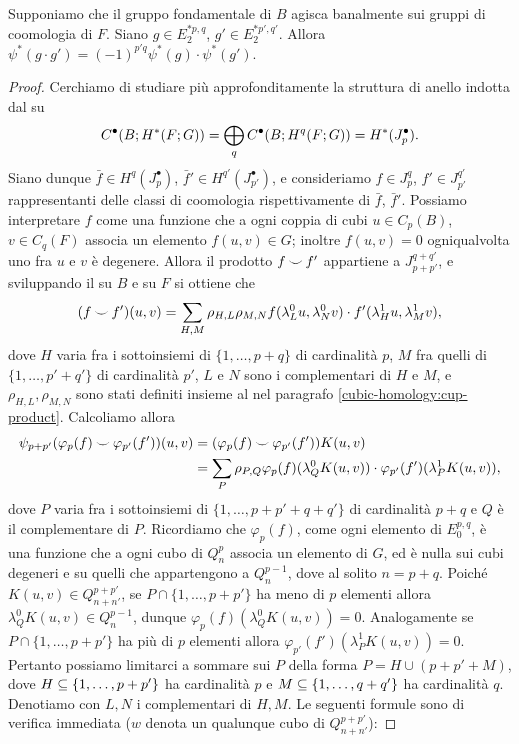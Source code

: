 \begin{proposition}
Supponiamo che il gruppo fondamentale di \(B\) agisca banalmente sui gruppi di coomologia di \(F\). Siano \(g\in E^{\ast p,q}_2\), \(g'\in E^{\ast p',q'}_2\). Allora \(\psi^*(g\cdot g')=(-1)^{p'q}\psi^*(g)\cdot\psi^*(g')\).
\end{proposition}
\begin{proof}
Cerchiamo di studiare più approfonditamente la struttura di anello indotta dal \cupproduct{} su 
\[
C^\bullet(B;H^*(F;G))=\bigoplus_qC^\bullet(B;H^q(F;G))=H^*(J^\bullet_p).
\]
Siano dunque \(\bar{f}\in H^q(J^\bullet_p)\), \(\bar{f}'\in H^{q'}(J^\bullet_{p'})\), e consideriamo \(f\in J^q_p\), \(f'\in J^{q'}_{p'}\) rappresentanti delle classi di coomologia rispettivamente di \(\bar{f}\), \(\bar{f}'\). Possiamo interpretare \(f\) come una funzione che a ogni coppia di cubi \(u\in C_p(B)\), \(v\in C_q(F)\) associa un elemento \(f(u,v)\in G\); inoltre \(f(u,v)=0\) ogniqualvolta uno fra \(u\) e \(v\) è degenere. Allora il prodotto \(f\mathbin{\smile} f'\) appartiene a \(J^{q+q'}_{p+p'}\), e sviluppando il \cupproduct{} su \(B\) e su \(F\) si ottiene che
\[
(f\mathbin{\smile} f')(u,v)=\sum_{H,M}\rho_{H,L}\rho_{M,N}f(\lambda^0_Lu,\lambda^0_Nv)\cdot f'(\lambda^1_Hu,\lambda^1_Mv),
\]
dove \(H\) varia fra i sottoinsiemi di \(\{1,\ldots,p+q\}\) di cardinalità \(p\), \(M\) fra quelli di \(\{1,\ldots,p'+q'\}\) di cardinalità \(p'\), \(L\) e \(N\) sono i complementari di \(H\) e \(M\), e \(\rho_{H,L},\rho_{M,N}\) sono stati definiti insieme al \cupproduct{} nel paragrafo \ref{cubic-homology:cup-product}. Calcoliamo allora
\begin{align*}
\psi_{p+p'}(\varphi_p(f)\mathbin{\smile}\varphi_{p'}(f'))(u,v)&=(\varphi_p(f)\mathbin{\smile}\varphi_{p'}(f'))K(u,v)\\
&=\sum_P\rho_{P,Q}\varphi_p(f)(\lambda^0_QK(u,v))\cdot\varphi_{p'}(f')(\lambda^1_PK(u,v)),
\end{align*}
dove \(P\) varia fra i sottoinsiemi di \(\{1,\ldots,p+p'+q+q'\}\) di cardinalità \(p+q\) e \(Q\) è il complementare di \(P\). Ricordiamo che \(\varphi_p(f)\), come ogni elemento di \(E^{p,q}_0\), è una funzione che a ogni cubo di \(Q^p_n\) associa un elemento di \(G\), ed è nulla sui cubi degeneri e su quelli che appartengono a \(Q^{p-1}_n\), dove al solito \(n=p+q\). Poiché \(K(u,v)\in Q^{p+p'}_{n+n'}\), se \(P\cap\{1,\ldots,p+p'\}\) ha meno di \(p\) elementi allora \(\lambda^0_QK(u,v)\in Q^{p-1}_{n}\), dunque \(\varphi_{p}(f)(\lambda^0_QK(u,v))=0\). Analogamente se \(P\cap\{1,\ldots,p+p'\}\) ha più di \(p\) elementi allora \(\varphi_{p'}(f')(\lambda^1_PK(u,v))=0\). Pertanto possiamo limitarci a sommare sui \(P\) della forma \(P=H\cup(p+p'+M)\), dove \(H\subseteq\{1,\ldots,p+p'\}\) ha cardinalità \(p\) e \(M\subseteq\{1,\ldots,q+q'\}\) ha cardinalità \(q\). Denotiamo con \(L,N\) i complementari di \(H,M\). Le seguenti formule sono di verifica immediata (\(w\) denota un qualunque cubo di \(Q^{p+p'}_{n+n'}\)):

\end{proof}
